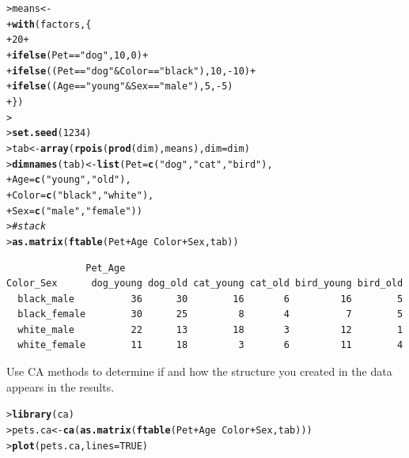 \documentclass[10pt]{report}\usepackage[]{graphicx}\usepackage[]{color}
\makeatletter
\newcommand{\hlnum}[1]{\textcolor[rgb]{0.686,0.059,0.569}{#1}}%
\newcommand{\hlstr}[1]{\textcolor[rgb]{0.192,0.494,0.8}{#1}}%
\newcommand{\hlcom}[1]{\textcolor[rgb]{0.678,0.584,0.686}{\textit{#1}}}%
\newcommand{\hlopt}[1]{\textcolor[rgb]{0,0,0}{#1}}%
\newcommand{\hlstd}[1]{\textcolor[rgb]{0.345,0.345,0.345}{#1}}%
\newcommand{\hlkwb}[1]{\textcolor[rgb]{0.69,0.353,0.396}{#1}}%
\newcommand{\hlkwc}[1]{\textcolor[rgb]{0.333,0.667,0.333}{#1}}%
\newcommand{\hlkwd}[1]{\textcolor[rgb]{0.737,0.353,0.396}{\textbf{#1}}}%
\newenvironment{kframe}{%
 \def\at@end@of@kframe{}%
 \ifinner\ifhmode%
  \def\at@end@of@kframe{\end{minipage}}%
  \begin{minipage}{\columnwidth}%
 \fi\fi%
 \def\FrameCommand##1{\hskip\@totalleftmargin \hskip-\fboxsep
 \colorbox{shadecolor}{##1}\hskip-\fboxsep
     \hskip-\linewidth \hskip-\@totalleftmargin \hskip\columnwidth}%
 \MakeFramed {\advance\hsize-\width
   \@totalleftmargin\z@ \linewidth\hsize
   \@setminipage}}%
 {\par\unskip\endMakeFramed%
 \at@end@of@kframe}
\newenvironment{knitrout}{}{} %
\renewenvironment{knitrout}{\small\renewcommand{\baselinestretch}{.85}}{} %
\makeatother
\begin{document}
\begin{Exercises}
\begin{enumerate*}
\begin{ans}
\begin{knitrout}
\begin{kframe}
\begin{alltt}
\hlstd{> }\hlstd{means} \hlkwb{<-}
\hlstd{+ }\hlkwd{with}\hlstd{(factors, \{}
\hlstd{+ }       \hlnum{20} \hlopt{+}
\hlstd{+ }       \hlkwd{ifelse}\hlstd{(Pet}\hlopt{==}\hlstr{"dog"}\hlstd{,} \hlnum{10}\hlstd{,} \hlnum{0}\hlstd{)} \hlopt{+}
\hlstd{+ }       \hlkwd{ifelse}\hlstd{((Pet}\hlopt{==}\hlstr{"dog"} \hlopt{&} \hlstd{Color}\hlopt{==}\hlstr{"black"}\hlstd{),} \hlnum{10}\hlstd{,} \hlopt{-}\hlnum{10}\hlstd{)} \hlopt{+}
\hlstd{+ }       \hlkwd{ifelse}\hlstd{((Age}\hlopt{==}\hlstr{"young"} \hlopt{&} \hlstd{Sex}\hlopt{==}\hlstr{"male"}\hlstd{),} \hlnum{5}\hlstd{,} \hlopt{-}\hlnum{5}\hlstd{)}
\hlstd{+ }       \hlstd{\})}
\hlstd{> }                 
\hlstd{> }\hlkwd{set.seed}\hlstd{(}\hlnum{1234}\hlstd{)}
\hlstd{> }\hlstd{tab} \hlkwb{<-} \hlkwd{array}\hlstd{(}\hlkwd{rpois}\hlstd{(}\hlkwd{prod}\hlstd{(dim), means),} \hlkwc{dim}\hlstd{=dim)}
\hlstd{> }\hlkwd{dimnames}\hlstd{(tab)} \hlkwb{<-} \hlkwd{list}\hlstd{(}\hlkwc{Pet}\hlstd{=}\hlkwd{c}\hlstd{(}\hlstr{"dog"}\hlstd{,}\hlstr{"cat"}\hlstd{,}\hlstr{"bird"}\hlstd{),}
\hlstd{+ }                      \hlkwc{Age}\hlstd{=}\hlkwd{c}\hlstd{(}\hlstr{"young"}\hlstd{,}\hlstr{"old"}\hlstd{),}
\hlstd{+ }                      \hlkwc{Color}\hlstd{=}\hlkwd{c}\hlstd{(}\hlstr{"black"}\hlstd{,} \hlstr{"white"}\hlstd{),}
\hlstd{+ }                      \hlkwc{Sex}\hlstd{=}\hlkwd{c}\hlstd{(}\hlstr{"male"}\hlstd{,} \hlstr{"female"}\hlstd{))}
\hlstd{> }\hlcom{# stack }
\hlstd{> }\hlkwd{as.matrix}\hlstd{(}\hlkwd{ftable}\hlstd{(Pet} \hlopt{+} \hlstd{Age} \hlopt{~} \hlstd{Color} \hlopt{+} \hlstd{Sex, tab))}
\end{alltt}
\begin{verbatim}
              Pet_Age
Color_Sex      dog_young dog_old cat_young cat_old bird_young bird_old
  black_male          36      30        16       6         16        5
  black_female        30      25         8       4          7        5
  white_male          22      13        18       3         12        1
  white_female        11      18         3       6         11        4
\end{verbatim}
\end{kframe}
\end{knitrout}
    \end{ans}
    
    \item Use CA methods to determine if and how the structure you created in the data appears in
    the results.
    \begin{ans}
\begin{knitrout}\footnotesize
{}\color{fgcolor}\begin{kframe}
\begin{alltt}
\hlstd{> }\hlkwd{library}\hlstd{(ca)}
\hlstd{> }\hlstd{pets.ca} \hlkwb{<-} \hlkwd{ca}\hlstd{(}\hlkwd{as.matrix}\hlstd{(}\hlkwd{ftable}\hlstd{(Pet} \hlopt{+} \hlstd{Age} \hlopt{~} \hlstd{Color} \hlopt{+} \hlstd{Sex, tab)))}
\hlstd{> }\hlkwd{plot}\hlstd{(pets.ca,} \hlkwc{lines}\hlstd{=}\hlnum{TRUE}\hlstd{)}
\end{alltt}
\end{kframe}


\end{knitrout}
\end{ans}
\end{enumerate*}
\end{Exercises}
\end{document}
